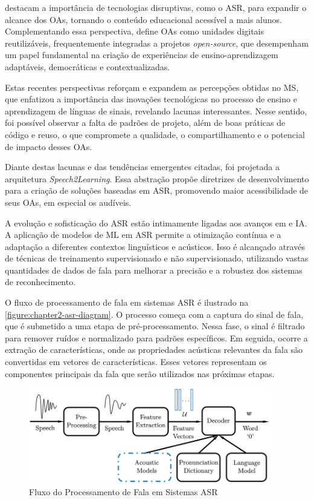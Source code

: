  destacam a importância de tecnologias disruptivas, como o ASR, para expandir o alcance dos OAs, tornando o conteúdo educacional acessível a mais alunos. Complementando essa perspectiva,  define OAs como unidades digitais reutilizáveis, frequentemente integradas a projetos \textit{open-source}, que desempenham um papel fundamental na criação de experiências de ensino-aprendizagem adaptáveis, democráticas e contextualizadas.

Estas recentes perspectivas reforçam e expandem as percepções obtidas no MS, que enfatizou a importância das inovações tecnológicas no processo de ensino e aprendizagem de línguas de sinais, revelando lacunas interessantes. Nesse sentido, foi possível observar a falta de padrões de projeto, além de boas práticas de código e reuso, o que compromete a qualidade, o compartilhamento e o potencial de impacto desses OAs.

Diante destas lacunas e das tendências emergentes citadas, foi projetada a arquitetura \textit{Speech2Learning}. Essa abstração propõe diretrizes de desenvolvimento para a criação de soluções baseadas em ASR, promovendo maior acessibilidade de seus OAs, em especial os audíveis.

A evolução e sofisticação do ASR estão intimamente ligadas aos avanços em  e IA. A aplicação de modelos de ML em ASR permite a otimização contínua e a adaptação a diferentes contextos linguísticos e acústicos. Isso é alcançado através de técnicas de treinamento supervisionado e não supervisionado, utilizando vastas quantidades de dados de fala para melhorar a precisão e a robustez dos sistemas de reconhecimento.

O fluxo de processamento de fala em sistemas ASR é ilustrado na \autoref{figure:chapter2-asr-diagram}. O processo começa com a captura do sinal de fala, que é submetido a uma etapa de pré-processamento. Nessa fase, o sinal é filtrado para remover ruídos e normalizado para padrões específicos. Em seguida, ocorre a extração de características, onde as propriedades acústicas relevantes da fala são convertidas em vetores de características. Esses vetores representam os componentes principais da fala que serão utilizados nas próximas etapas.

\begin{figure}[htb]
\centering
\caption{Fluxo do Processamento de Fala em Sistemas ASR}
\label{figure:chapter2-asr-diagram}
\includegraphics[width=0.94\textwidth]{images/chapter2-asr-diagram.png}
\end{figure}

